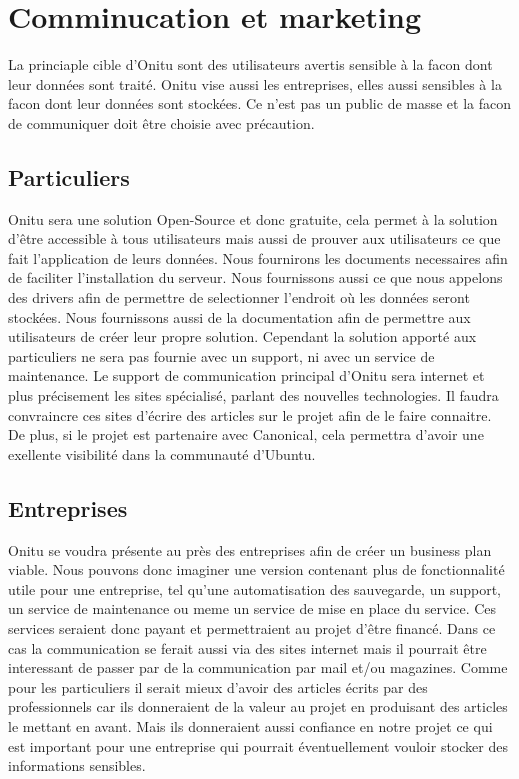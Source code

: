 \section{Comminucation et marketing}
La princiaple cible d'Onitu sont des utilisateurs avertis sensible à la facon dont leur données sont traité. Onitu vise aussi les entreprises, elles aussi sensibles à la facon dont leur données sont stockées. Ce n'est pas un public de masse et la facon de communiquer doit être choisie avec précaution.

\subsection{Particuliers}
Onitu sera une solution Open-Source et donc gratuite, cela permet à la solution d'être accessible à tous utilisateurs mais aussi de prouver aux utilisateurs ce que fait l'application de leurs données. Nous fournirons les documents necessaires afin de faciliter l'installation du serveur. Nous fournissons aussi ce que nous appelons des drivers afin de permettre de selectionner l'endroit où les données seront stockées. Nous fournissons aussi de la documentation afin de permettre aux utilisateurs de créer leur propre solution. Cependant la solution apporté aux particuliers ne sera pas fournie avec un support, ni avec un service de maintenance.
Le support de communication principal d'Onitu sera internet et plus précisement les sites spécialisé, parlant des nouvelles technologies. Il faudra convraincre ces sites d'écrire des articles sur le projet afin de le faire connaitre. De plus, si le projet est partenaire avec Canonical, cela permettra d'avoir une exellente visibilité dans la communauté d'Ubuntu.

\subsection{Entreprises}
Onitu se voudra présente au près des entreprises afin de créer un business plan viable. Nous pouvons donc imaginer une version contenant plus de fonctionnalité utile pour une entreprise, tel qu'une automatisation des sauvegarde, un support, un service de maintenance ou meme un service de mise en place du service. Ces services seraient donc payant et permettraient au projet d'être financé. Dans ce cas la communication se ferait aussi via des sites internet mais il pourrait être interessant de passer par de la communication par mail et/ou magazines. Comme pour les particuliers il serait mieux d'avoir des articles écrits par des professionnels car ils donneraient de la valeur au projet en produisant des articles le mettant en avant. Mais ils donneraient aussi confiance en notre projet ce qui est important pour une entreprise qui pourrait éventuellement vouloir stocker des informations sensibles.
